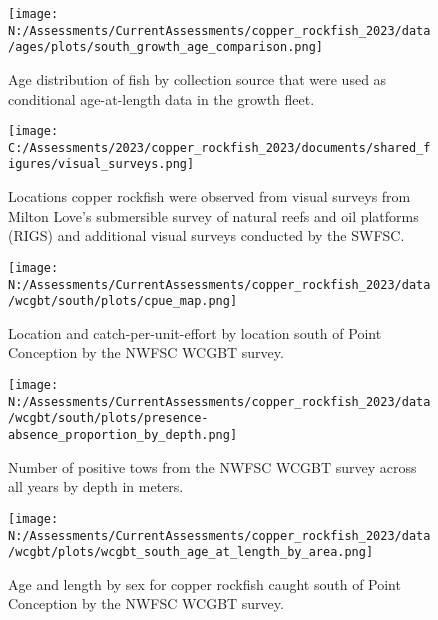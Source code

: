 \documentclass[11pt,
  english,
  letterpaper,
]{article}
\begin{document}
\pagebreak

\begin{figure}
\centering
\texttt{[image: N:/Assessments/CurrentAssessments/copper\_rockfish\_2023/data/ages/plots/south\_growth\_age\_comparison.png]}
\caption{Age distribution of fish by collection source that were used as conditional age-at-length data in the growth fleet.\label{fig:growth-age-dist}}
\end{figure}

\pagebreak

\begin{figure}
\centering
\texttt{[image: C:/Assessments/2023/copper\_rockfish\_2023/documents/shared\_figures/visual\_surveys.png]}
\caption{Locations copper rockfish were observed from visual surveys from Milton Love's submersible survey of natural reefs and oil platforms (RIGS) and additional visual surveys conducted by the SWFSC.\label{fig:visual-surveys}}
\end{figure}

\begin{figure}
\centering
\texttt{[image: N:/Assessments/CurrentAssessments/copper\_rockfish\_2023/data/wcgbt/south/plots/cpue\_map.png]}
\caption{Location and catch-per-unit-effort by location south of Point Conception by the NWFSC WCGBT survey.\label{fig:wcgbt-cpue}}
\end{figure}

\pagebreak

\begin{figure}
\centering
\texttt{[image: N:/Assessments/CurrentAssessments/copper\_rockfish\_2023/data/wcgbt/south/plots/presence-absence\_proportion\_by\_depth.png]}
\caption{Number of positive tows from the NWFSC WCGBT survey across all years by depth in meters.\label{fig:wcgbt-depth}}
\end{figure}

\pagebreak

\begin{figure}
\centering
\texttt{[image: N:/Assessments/CurrentAssessments/copper\_rockfish\_2023/data/wcgbt/plots/wcgbt\_south\_age\_at\_length\_by\_area.png]}
\caption{Age and length by sex for copper rockfish caught south of Point Conception by the NWFSC WCGBT survey.\label{fig:wcgbt-len-age}}
\end{figure}

\pagebreak
\end{document}
